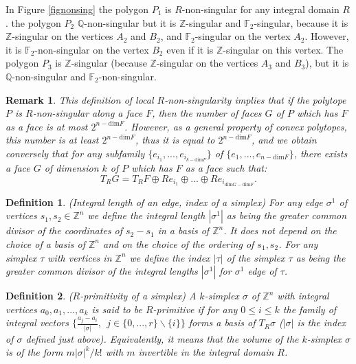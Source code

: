 \documentclass{article}
\newtheorem{definition}{Definition}
\newtheorem{remark}{Remark}
\begin{document}
In Figure \ref{fignonsing} the polygon $P_1$ is $R$-non-singular for any integral domain $R$. the polygon $P_2$ $\mathbb{Q}$-non-singular but it is $\mathbb{Z}$-singular and $\mathbb{F}_2$-singular, because it is $\mathbb{Z}$-singular on the vertices $A_2$ and $B_2$, and $\mathbb{F}_2$-singular on the vertex $A_2$. However, it is $\mathbb{F}_2$-non-singular on the vertex $B_2$ even if it is $\mathbb{Z}$-singular on this vertex. The polygon $P_3$ is $\mathbb{Z}$-singular (because $\mathbb{Z}$-singular on the vertices $A_3$ and $B_3$), but it is $\mathbb{Q}$-non-singular and $\mathbb{F}_2$-non-singular.

\begin{remark}
    This definition of local $R$-non-singularity implies that if the polytope $P$ is $R$-non-singular along a face $F$, then the number of faces $G$ of $P$ which has $F$ as a face is at most $2^{n-\mathrm{dim}F}$. However, as a general property of convex polytopes, this number is at least $2^{n-\mathrm{dim}F}$, thus it is equal to $2^{n-\mathrm{dim}F}$, and we obtain conversely that for any subfamily $\{e_{i_1},...,e_{i_{k-\mathrm{dim}F}}\}$ of $\{e_1,...,e_{n-\mathrm{dim}F}\}$, there exists a face $G$ of dimension $k$ of $P$ which has $F$ as a face such that:
    \begin{equation*}
        T_RG=T_RF\oplus Re_{i_1}\oplus...\oplus Re_{i_{\mathrm{dim}G-\mathrm{dim}F}}.
    \end{equation*}
    \label{bij}
\end{remark}

\begin{definition}
    (Integral length of an edge, index of a simplex) For any edge $\sigma^1$ of vertices $s_1,s_2 \in \mathbb{Z}^n$ we define the integral length $|\sigma^1|$ as being the greater common divisor of the coordinates of $s_2 - s_1$ in a basis of $\mathbb{Z}^n$. It does not depend on the choice of a basis of $\mathbb{Z}^n$ and on the choice of the ordering of $s_1,s_2$. For any simplex $\tau$ with vertices in $\mathbb{Z}^n$ we define the index $|\tau|$ of the simplex $\tau$ as being the greater common divisor of the integral lengths $|\sigma^1|$ for $\sigma^1$ edge of $\tau$.
    \label{index}
\end{definition}

\begin{definition}
    ($R$-primitivity of a simplex) A $k$-simplex $\sigma$ of $\mathbb{Z}^n$ with integral vertices $a_0,a_1,...,a_k$ is said to be $R$-primitive if for any $0\leq i \leq k$ the family of integral vectors $\{\frac{a_j-a_i}{|\sigma|},~~j\in\{0,...,r\}\backslash\{i\}\}$ forms a basis of $T_R\sigma$ ($|\sigma|$ is the index of $\sigma$ defined just above). Equivalently, it means that the volume of the $k$-simplex $\sigma$ is of the form $m |\sigma|^k/k!$ with $m$ invertible in the integral domain $R$.
    \label{primsimp}
\end{definition}
\end{document}
